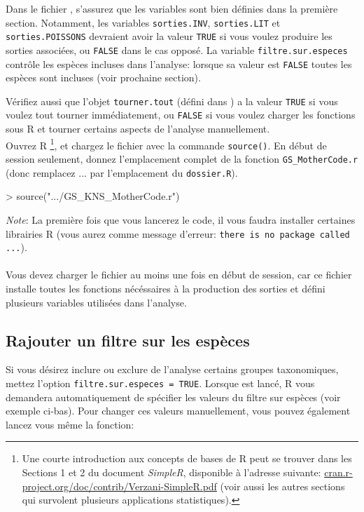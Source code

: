 \documentclass{article}
\begin{document}
   Dans le fichier \mcode, s'assurez que les variables sont bien définies dans
   la première section. Notamment, les variables
   \texttt{sorties.INV}, \texttt{sorties.LIT} et
   \texttt{sorties.POISSONS} devraient avoir la valeur \texttt{TRUE} si vous
   voulez produire les sorties associées, ou \texttt{FALSE} dans le
   cas opposé. La variable \texttt{filtre.sur.especes} contrôle les
   espèces incluses dans l'analyse: lorsque sa valeur est
   \texttt{FALSE} toutes les espèces sont incluses (voir prochaine
   section).

  Vérifiez aussi que l'objet \texttt{tourner.tout} (défini dans \mcode) a la valeur \texttt{TRUE} si vous voulez
tout tourner immédiatement, ou \texttt{FALSE} si vous voulez
charger les fonctions sous R et tourner certains
aspects de l'analyse manuellement.
\\
Ouvrez R \footnote{Une courte introduction aux concepts de bases de R peut
  se trouver dans les Sections 1 et 2 du document \emph{SimpleR}, disponible
  à l'adresse suivante:
  \url{cran.r-project.org/doc/contrib/Verzani-SimpleR.pdf} (voir aussi
  les autres sections qui survolent plusieurs applications
  statistiques).}, et chargez le fichier \mcode {} avec la commande
\texttt{source()}.
  En début de session seulement, donnez
  l'emplacement complet de la fonction \texttt{GS\_MotherCode.r} (donc
  remplacez ... par l'emplacement du \texttt{dossier.R}).


\begin{Schunk}
\begin{Sinput}
> source(".../GS_KNS_MotherCode.r")
\end{Sinput}
\end{Schunk}

\emph{Note}: La première fois que vous lancerez le code, il vous
faudra installer certaines librairies R (vous aurez comme message d'erreur:
\texttt{there is no package called ...}). \\
\\

 Vous devez charger le fichier \mcode {} au moins
une fois en début de session, car ce fichier installe toutes les fonctions nécéssaires à la production des
sorties et défini plusieurs
variables utilisées dans l'analyse.

\subsection*{Rajouter un filtre sur les espèces}
Si vous désirez inclure ou exclure de l'analyse certains groupes
taxonomiques, mettez l'option \texttt{filtre.sur.especes =
  TRUE}. Lorsque \mcode {} est lancé, R vous
demandera automatiquement de spécifier les valeurs du filtre sur
espèces (voir exemple ci-bas). Pour changer ces valeurs manuellement,
vous pouvez également lancez
vous même la fonction:
\end{document}
